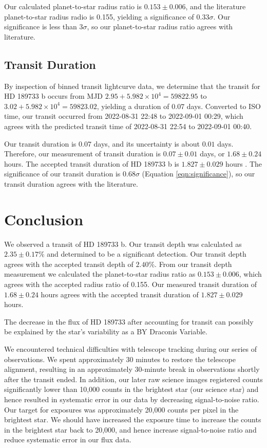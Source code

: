 \documentclass[twocolumn]{aastex631}
\begin{document}
Our calculated planet-to-star radius ratio is $0.153 \pm 0.006$, and the literature planet-to-star radius radio is 0.155, yielding a significance of $0.33\sigma$. Our significance is less than $3\sigma$, so our planet-to-star radius ratio agrees with literature.

\subsection{Transit Duration} \label{subsec:duration}

By inspection of binned transit lightcurve data, we determine that the transit for HD 189733 b occurs from MJD $2.95 + 5.982 \times 10^4 = 59822.95$ to $3.02 + 5.982 \times 10^4 = 59823.02$, yielding a duration of $0.07$ days. Converted to ISO time, our transit occurred from 2022-08-31 22:48 to 2022-09-01 00:29, which agrees with the predicted transit time of 2022-08-31 22:54 to 2022-09-01 00:40.

Our transit duration is $0.07$ days, and its uncertainty is about $0.01$ days. Therefore, our measurement of transit duration is $0.07\pm 0.01$ days, or $1.68 \pm 0.24$ hours. The accepted transit duration of HD 189733 b is $1.827 \pm 0.029$ hours \citep{Winn_2007}. The significance of our transit duration is $0.68\sigma$ (Equation \ref{eqn:significance}), so our transit duration agrees with the literature.

\section{Conclusion} \label{sec:conclusion}

We observed a transit of HD 189733 b. Our transit depth was calculated as $2.35\pm 0.17\%$ and determined to be a significant detection. Our transit depth agrees with the accepted transit depth of $2.40\%$. From our transit depth measurement we calculated the planet-to-star radius ratio as $0.153 \pm 0.006$, which agrees with the accepted radius ratio of 0.155. Our measured transit duration of $1.68 \pm 0.24$ hours agrees with the accepted transit duration of $1.827 \pm 0.029$ hours. 

The decrease in the flux of HD 189733 after accounting for transit can possibly be explained by the star's variability as a BY Draconis Variable. 

We encountered technical difficulties with telescope tracking during our series of observations. We spent approximately 30 minutes to restore the telescope alignment, resulting in an approximately 30-minute break in observations shortly after the transit ended. In addition, our later raw science images registered counts significantly lower than 10,000 counts in the brightest star (our science star) and hence resulted in systematic error in our data by decreasing signal-to-noise ratio. Our target for exposures was approximately 20,000 counts per pixel in the brightest star. We should have increased the exposure time to increase the counts in the brightest star back to 20,000, and hence increase signal-to-noise ratio and reduce systematic error in our flux data. \citep{vdl_2022_4}
\end{document}
